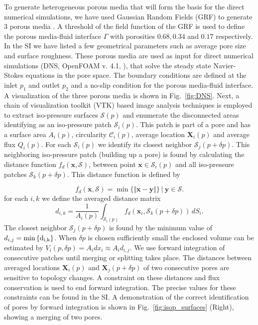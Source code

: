 \documentclass[draft]{agujournal2019}
\begin{document}
To generate heterogeneous porous media that will form the basis for the direct numerical simulations, we have used Gaussian Random Fields (GRF) to generate 3 porous media \cite{teubner_level_1991,hyman_heterogeneities_2012,siena_relationship_2014}. A threshold of the field function of the GRF is used to define the porous media-fluid interface $\Gamma$ with porosities $0.68, 0.34$ and $0.17$ respectively. In the SI we have listed a few geometrical parameters such as average pore size and surface roughness. These porous media are used as input for direct numerical simulations (DNS, OpenFOAM v. 4.1, ), that solve the steady state Navier-Stokes equations in the pore space. The boundary conditions are defined at the inlet $p_1$ and outlet $p_2$ and a no-slip condition for the porous media-fluid interface. A visualization of the three porous media is shown in Fig.~\ref{fig:DNS}. Next, a chain of visualization toolkit (VTK) based image analysis techniques \cite{schroeder_visualization_2006,hernderson_paraview_2007} is employed to extract iso-pressure surfaces $\mathcal{S}(p)$ and enumerate the disconnected areas identifying as an iso-pressure patch $\mathcal{S}_i(p)$. This patch is part of a pore and has a surface area $A_i(p)$, circularity $\mathcal{C}_i(p)$, average location $\mathbf{X}_i(p)$ and average flux $Q_i(p)$. For each $\mathcal{S}_i(p)$ we identify its closest neighbor $\mathcal{S}_j(p+\delta p)$. This neighboring iso-pressure patch (building up a pore) is found by calculating the distance function $f_d(\mathbf{x},\mathcal{S})$, between point $\mathbf{x}\in \mathcal{S}_i(p)$ and all iso-pressure patches $\mathcal{S}_k(p+\delta p)$. This distance function is defined by

\begin{equation}
	f_d\left(\mathbf{x},\mathcal{S}\right) = \min \{\Vert\mathbf{x}-\mathbf{y}\Vert \} ~|~ \mathbf{y}\in \mathcal{S}.
\end{equation}
for each $i,k$ we define the averaged distance matrix 
\begin{equation}
	d_{i,k} = \frac{1}{A_i(p)}\int_{\mathcal{S}_i(p)} f_d(\mathbf{x}_i,\mathcal{S}_k(p+\delta p)) \,dS_i.
\end{equation}
The closest neighbor $\mathcal{S}_j(p+\delta p)$ is found by the minimum value of $d_{i,j} = \rm{min}\left\{ d_{i,k}\right\}$. When $\delta p$ is chosen sufficiently small the enclosed volume can be estimated by $V_i(p,\delta p)=A_id x_i \approx A_i d_{i,j}$. We use forward integration of consecutive patches until merging or splitting takes place. The distances between averaged locations $\mathbf{X}_i(p)$ and $\mathbf{X}_j(p+\delta p)$ of two consecutive pores are sensitive to topology changes. A constraint on these distances and flux conservation is used to end forward integration. The precise values for these constraints can be found in the SI. A demonstration of the correct identification of pores by forward integration is shown in Fig.~\ref{fig:isop_surfaces} (Right), showing a merging of two pores. 
\end{document}
